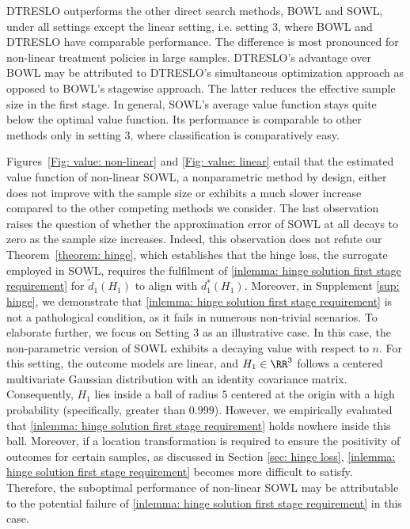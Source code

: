 \documentclass[preprint] {imsart}
\begin{document}
DTRESLO outperforms the other direct search methods, BOWL and SOWL, under all settings except the linear setting, i.e. setting 3, where BOWL and DTRESLO have  comparable performance.  The difference is most pronounced for non-linear treatment policies in large samples.
  DTRESLO's advantage over BOWL may be attributed to DTRESLO's simultaneous optimization approach as opposed to BOWL's stagewise approach. The  latter reduces the effective sample size in the first stage.  In general, SOWL's average value function  stays quite below the optimal value function. 
  Its performance is comparable to other methods only in  setting 3, where classification is comparatively easy. 

{\color{black} \label{page: setting 3}   Figures~\ref{Fig: value: non-linear} and \ref{Fig: value: linear} entail that the estimated value function of  non-linear SOWL, a nonparametric method by design,  either does not improve with the sample size or exhibits a much slower increase compared to the other competing methods we consider.  The last observation raises the question of whether the approximation error of SOWL at all decays to zero as the sample size increases. Indeed, this observation does not refute our Theorem~\ref{theorem: hinge}, which establishes that the hinge loss, the surrogate employed in SOWL, requires the fulfilment of  \eqref{inlemma: hinge solution first stage requirement} for $\tilde{d}_1(H_1)$ to align with $d^*_1(H_1)$. Moreover, in Supplement \ref{sup: hinge}, we demonstrate that \eqref{inlemma: hinge solution first stage requirement} is not a pathological condition, as it fails in numerous non-trivial scenarios. To elaborate further, we focus on Setting 3 as an illustrative case.  In this case, the non-parametric version of SOWL exhibits a decaying value with respect to $n$. For this setting, the outcome models are linear, and $H_1\in \RR^3$ follows a centered multivariate Gaussian distribution with an identity covariance matrix. Consequently, $H_1$ lies inside a ball of radius $5$ centered at the origin with a high probability (specifically, greater than $0.999$). However, we empirically evaluated that \eqref{inlemma: hinge solution first stage requirement} holds nowhere inside this ball. Moreover, if a location transformation is required to ensure the positivity of outcomes for certain samples, as discussed in Section \ref{sec: hinge loss}, \eqref{inlemma: hinge solution first stage requirement} becomes more difficult to satisfy. Therefore, the suboptimal performance of non-linear SOWL  may be attributable to the potential failure of \eqref{inlemma: hinge solution first stage requirement} in this case.}
  
\end{document}
